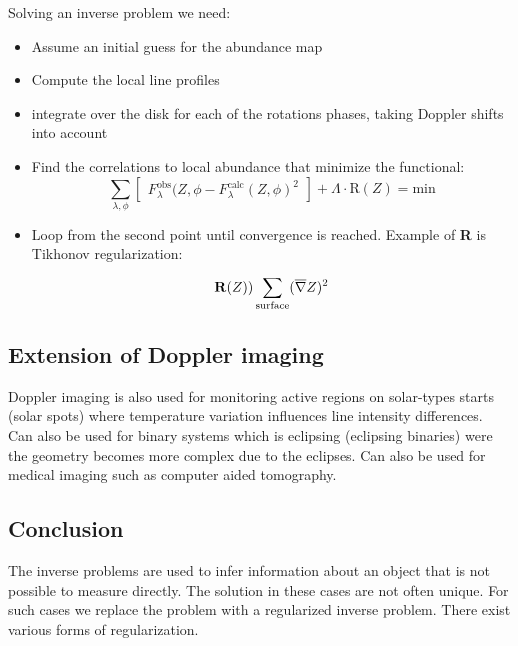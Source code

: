 	Solving an inverse problem we need: 

	\begin{itemize}
	    	\item Assume an initial guess for the abundance map
	    	\item Compute the local line profiles
	    	\item integrate over the disk for each of the rotations phases, taking Doppler shifts into account
	    	\item Find the correlations to local abundance that minimize the functional:
		    	\begin{equation}
		    		\sum_{\lambda, \phi}^{}\begin{bmatrix} F^{\text{obs}}_\lambda(Z,\phi - F^{\text{calc}}_\lambda(Z,\phi)^2 \end{bmatrix} + \Lambda \cdot \text{R}(Z) = \text{min}	  
		    	\end{equation} 
		    \item Loop from the second point until convergence is reached. Example of \textbf{R} is Tikhonov regularization:
			    \begin{equation}
			    	\text{\textbf{R}}(Z) ) \sum_{\text{surface}}^{}(\overline{\nabla} Z)^2 
			    \end{equation}
	    \end{itemize}

	\subsection{Extension of Doppler imaging}
	Doppler imaging is also used for monitoring active regions on solar-types starts (solar spots) where temperature variation influences line intensity differences. Can also be used for binary systems which is eclipsing (eclipsing binaries) were the geometry becomes more complex due to the eclipses. Can also be used for medical imaging such as computer aided tomography. 

	\subsection{Conclusion}
	The inverse problems are used to infer information about an object that is not possible to measure directly. The solution in these cases are not often unique. For such cases we replace the problem with a regularized inverse problem. There exist various forms of regularization. 
	        











	 
